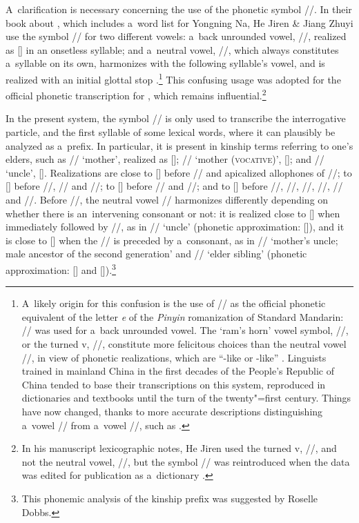 		A~clarification is necessary concerning the use of the phonetic symbol //. In their \citeyear{heetal1985} book about , which includes a~word list for Yongning Na, He Jiren \& Jiang Zhuyi use the symbol // for two different vowels: a~back unrounded vowel, //, realized as [] in an onsetless syllable; and a~neutral vowel, //, which always constitutes a~syllable on its own, harmonizes with the following syllable’s vowel, and is realized with an initial glottal stop \citep[130]{michaud2013b}.\footnote{A~likely origin for this confusion is the use of // as the official phonetic equivalent of the letter \textit{e} of the \textit{Pinyin} romanization of Standard {Mandarin}: // was used for a~back unrounded vowel. The ‘ram’s horn’ vowel symbol, //, or the turned v, //, constitute more felicitous choices than the neutral vowel //, in view of phonetic realizations, which are “-like or -like” \citep[42]{association1949}. Linguists trained in mainland China in the first decades of the People's Republic of China tended to base their transcriptions on this system, reproduced in dictionaries and textbooks until the turn of the twenty"=first century. Things have now changed, thanks to more accurate descriptions distinguishing a~vowel // from a~vowel //, such as \citet[110]{waisumetal2003}.} This confusing usage was adopted for the official phonetic transcription for , which remains influential.\footnote{In his manuscript lexicographic notes, He Jiren used the turned v, //, and not the neutral vowel, //, but the symbol // was reintroduced when the data was edited for publication as a~dictionary \citep{heetal2011}.} 
		
		In the present system, the symbol // is only used to transcribe the {interrogative} particle, and the first syllable of some lexical words,
		where it can plausibly be analyzed as a~prefix. In particular, it is present in kinship terms referring to one's elders, such as
		// ‘mother’, realized as []; // ‘mother (\textsc{vocative})’,
		[]; and // ‘uncle’, []. Realizations are close to []
		before // and apicalized allophones of //; to [] before //, //
		and //; to [] before // and //; and to [] before //,
		//, //, //, // and //. Before //, the neutral vowel
		// harmonizes differently depending on whether there is an~intervening consonant or not: it
		is realized close to [] when immediately followed by //, as in // ‘uncle’
		(phonetic approximation: []), and it is close to [] when the // is preceded
		by a~consonant, as in // ‘mother’s uncle; male ancestor of the second generation’ and
		// ‘elder sibling’ (phonetic approximation: [] and []).\footnote{This phonemic
			analysis of the kinship {prefix} was suggested by Roselle Dobbs.}
		
